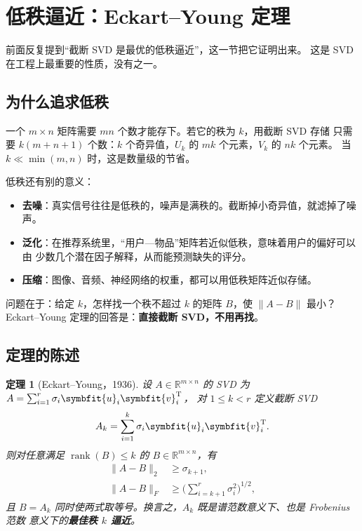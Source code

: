 \documentclass[UTF8, 11pt, a4paper, fontset=windows]{ctexart}
\theoremstyle{cnthm}
\newtheorem{thm}{定理}[section]
\theoremstyle{cndef}
\newcommand{\T}{^{\mathrm{T}}}
\newcommand{\R}{\mathbb{R}}
\newcommand{\nrm}[1]{\lVert #1 \rVert}
\DeclareMathOperator{\rank}{rank}
\newcommand{\bu}{\symbfit{u}}
\newcommand{\vv}{\symbfit{v}}
\begin{document}
\section{低秩逼近：Eckart--Young 定理}\label{sec:lowrank}

前面反复提到“截断 SVD 是最优的低秩逼近”，这一节把它证明出来。
这是 SVD 在工程上最重要的性质，没有之一。

\subsection{为什么追求低秩}

一个 $m\times n$ 矩阵需要 $mn$ 个数才能存下。若它的秩为 $k$，用截断 SVD 存储
只需要 $k(m+n+1)$ 个数：$k$ 个奇异值，$U_k$ 的 $mk$ 个元素，$V_k$ 的 $nk$ 个元素。
当 $k\ll\min(m,n)$ 时，这是数量级的节省。

低秩还有别的意义：

\begin{itemize}
  \item \textbf{去噪}：真实信号往往是低秩的，噪声是满秩的。截断掉小奇异值，就滤掉了噪声。
  \item \textbf{泛化}：在推荐系统里，“用户—物品”矩阵若近似低秩，意味着用户的偏好可以由
        少数几个潜在因子解释，从而能预测缺失的评分。
  \item \textbf{压缩}：图像、音频、神经网络的权重，都可以用低秩矩阵近似存储。
\end{itemize}

问题在于：给定 $k$，怎样找一个秩不超过 $k$ 的矩阵 $B$，使 $\nrm{A-B}$ 最小？
Eckart--Young 定理的回答是：\textbf{直接截断 SVD，不用再找}。

\subsection{定理的陈述}

\begin{thm}[Eckart--Young，1936]\label{thm:eckart-young}
设 $A\in\R^{m\times n}$ 的 SVD 为 $A=\sum_{i=1}^{r}\sigma_i\bu_i\vv_i\T$，
对 $1\le k<r$ 定义截断 SVD
\begin{equation}
  A_k=\sum_{i=1}^{k}\sigma_i\bu_i\vv_i\T .
\end{equation}
则对任意满足 $\rank(B)\le k$ 的 $B\in\R^{m\times n}$，有
\begin{align}
  \nrm{A-B}_2&\ge\sigma_{k+1}, \label{eq:ey-spectral}\\
  \nrm{A-B}_F&\ge\Big(\sum_{i=k+1}^{r}\sigma_i^2\Big)^{1/2}, \label{eq:ey-fro}
\end{align}
且 $B=A_k$ 同时使两式取等号。换言之，$A_k$ 既是谱范数意义下、也是 Frobenius 范数
意义下的\textbf{最佳秩 $k$ 逼近}。
\end{thm}
\end{document}
